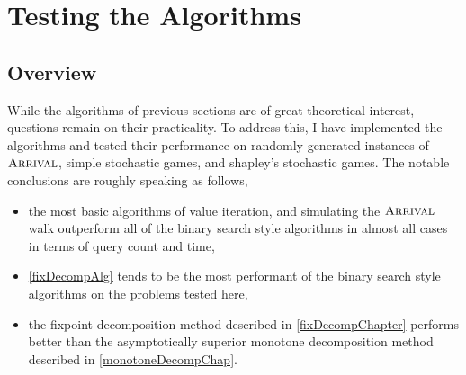 \chapter{Testing the Algorithms} \label{testingChap}
\newcommand{\code}[1]{\lstinline|#1|}
\section{Overview}
While the algorithms of previous sections are of great theoretical interest,
questions remain on their practicality. To address this,
I have implemented the algorithms and tested their performance on
randomly generated instances of $ \textsc{Arrival} $, simple stochastic games, and
shapley's stochastic games. The notable conclusions are roughly speaking as follows,
\begin{itemize}
  \item the most basic algorithms of value iteration, and simulating the $\textsc{Arrival}$ walk outperform all of the
binary search style algorithms in almost all cases in terms of query count and time,
\item \cref{fixDecompAlg} tends to be the most performant of the binary search style algorithms on the problems tested
  here,
  \item the fixpoint decomposition method described in \cref{fixDecompChapter} performs better than the asymptotically superior
monotone decomposition method described in \cref{monotoneDecompChap}.
\end{itemize}




